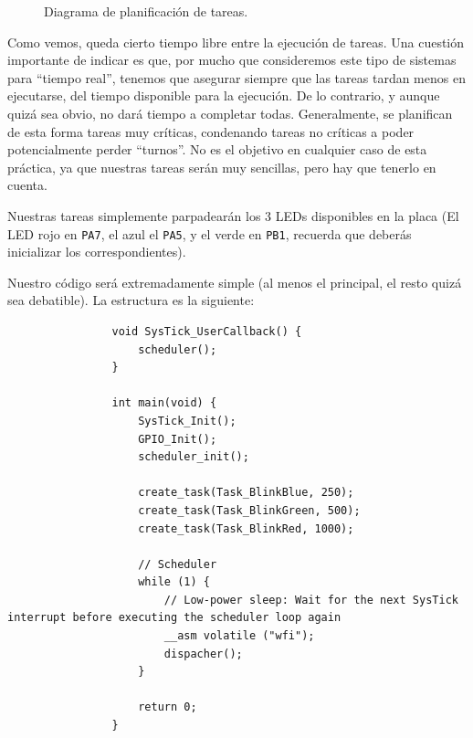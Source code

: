 \documentclass[../main.tex]{subfiles}
\begin{document}
\begin{figure}[htbp]
                \caption{Diagrama de planificación de tareas.}
                \label{fig:scheduled_tasks}
            \end{figure}

            Como vemos, queda cierto tiempo libre entre la ejecución de tareas. Una cuestión importante de indicar es que, por mucho que consideremos este tipo de sistemas para ``tiempo real'', tenemos que asegurar siempre que las tareas tardan menos en ejecutarse, del tiempo disponible para la ejecución. De lo contrario, y aunque quizá sea obvio, no dará tiempo a completar todas. Generalmente, se planifican de esta forma tareas muy críticas, condenando tareas no críticas a poder potencialmente perder ``turnos''. No es el objetivo en cualquier caso de esta práctica, ya que nuestras tareas serán muy sencillas, pero hay que tenerlo en cuenta.

            Nuestras tareas simplemente parpadearán los 3 LEDs disponibles en la placa (El LED rojo en \texttt{PA7}, el azul el \texttt{PA5}, y el verde en \texttt{PB1}, recuerda que deberás inicializar los  correspondientes).

            Nuestro código será extremadamente simple (al menos el principal, el resto quizá sea debatible). La estructura es la siguiente:

            \begin{lstlisting}
                void SysTick_UserCallback() {
                    scheduler();
                }

                int main(void) {
                    SysTick_Init();
                    GPIO_Init();
                    scheduler_init();

                    create_task(Task_BlinkBlue, 250);
                    create_task(Task_BlinkGreen, 500);
                    create_task(Task_BlinkRed, 1000);

                    // Scheduler
                    while (1) {
                        // Low-power sleep: Wait for the next SysTick interrupt before executing the scheduler loop again
                        __asm volatile ("wfi");
                        dispacher();
                    }

                    return 0;
                }
            \end{lstlisting}
\end{document}
